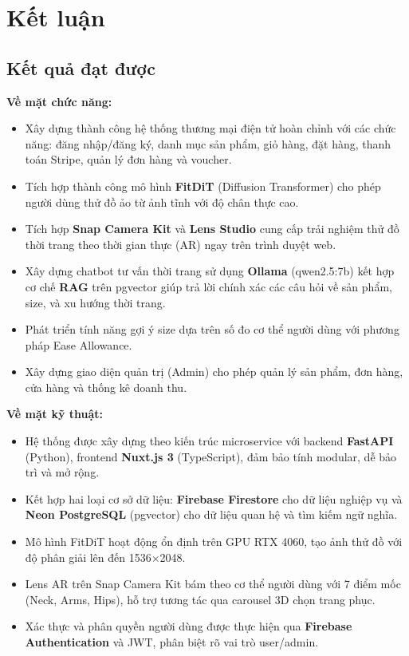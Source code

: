 \section{Kết luận}

\subsection{Kết quả đạt được}

\textbf{Về mặt chức năng:}
\begin{itemize}[noitemsep]
    \item Xây dựng thành công hệ thống thương mại điện tử hoàn chỉnh với các chức năng: đăng nhập/đăng ký, danh mục sản phẩm, giỏ hàng, đặt hàng, thanh toán Stripe, quản lý đơn hàng và voucher.
    \item Tích hợp thành công mô hình \textbf{FitDiT} (Diffusion Transformer) cho phép người dùng thử đồ ảo từ ảnh tĩnh với độ chân thực cao.
    \item Tích hợp \textbf{Snap Camera Kit} và \textbf{Lens Studio} cung cấp trải nghiệm thử đồ thời trang theo thời gian thực (AR) ngay trên trình duyệt web.
    \item Xây dựng chatbot tư vấn thời trang sử dụng \textbf{Ollama} (qwen2.5:7b) kết hợp cơ chế \textbf{RAG} trên pgvector giúp trả lời chính xác các câu hỏi về sản phẩm, size, và xu hướng thời trang.
    \item Phát triển tính năng gợi ý size dựa trên số đo cơ thể người dùng với phương pháp Ease Allowance.
    \item Xây dựng giao diện quản trị (Admin) cho phép quản lý sản phẩm, đơn hàng, cửa hàng và thống kê doanh thu.
\end{itemize}

\textbf{Về mặt kỹ thuật:}
\begin{itemize}[noitemsep]
    \item Hệ thống được xây dựng theo kiến trúc microservice với backend \textbf{FastAPI} (Python), frontend \textbf{Nuxt.js 3} (TypeScript), đảm bảo tính modular, dễ bảo trì và mở rộng.
    \item Kết hợp hai loại cơ sở dữ liệu: \textbf{Firebase Firestore} cho dữ liệu nghiệp vụ và \textbf{Neon PostgreSQL} (pgvector) cho dữ liệu quan hệ và tìm kiếm ngữ nghĩa.
    \item Mô hình FitDiT hoạt động ổn định trên GPU RTX 4060, tạo ảnh thử đồ với độ phân giải lên đến 1536$\times$2048.
    \item Lens AR trên Snap Camera Kit bám theo cơ thể người dùng với 7 điểm mốc (Neck, Arms, Hips), hỗ trợ tương tác qua carousel 3D chọn trang phục.
    \item Xác thực và phân quyền người dùng được thực hiện qua \textbf{Firebase Authentication} và JWT, phân biệt rõ vai trò user/admin.
\end{itemize}

